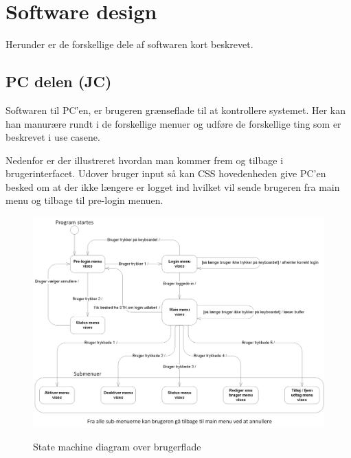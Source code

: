 \clearpage

\section{Software design}

Herunder er de forskellige dele af softwaren kort beskrevet. 

\subsection{PC delen (JC)}

Softwaren til PC'en, er brugeren grænseflade til at kontrollere systemet. Her kan han manurære rundt i de forskellige menuer og udføre de forskellige ting som er beskrevet i use casene.

Nedenfor er der illustreret hvordan man kommer frem og tilbage i brugerinterfacet. Udover bruger input så kan CSS hovedenheden give PC'en besked om at der ikke længere er logget ind hvilket vil sende brugeren fra main menu og tilbage til pre-login menuen.

\begin{figure}[htbp] \centering
{\includegraphics[width=\textwidth]{billeder/uml/state_machine_main}}
\caption{State machine diagram over brugerflade}
\label{lab:State machine diagram over brugerflade}
\end{figure}